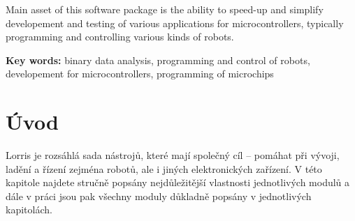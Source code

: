 \documentclass[12pt, a4paper, oneside]{article}
\newcommand{\D}{\medskip \noindent} %
\newcommand{\B}{\textbf} %
\begin{document}
Main asset of this software package is the ability to speed-up and simplify developement and testing of various applications for microcontrollers, typically programming and controlling various kinds of robots.

\D \B{Key words:} binary data analysis, programming and control of robots, developement for microcontrollers, programming of microchips

\addtolength{\textheight}{30mm} %

\newpage
\pagestyle{plain}

\setlength{\voffset}{-20mm} %
\setcounter{page}{1}  %

\tableofcontents  %

\addtolength{\textheight}{-30mm} %
\newpage
\setlength{\voffset}{0mm} %
\pagestyle{plain}

\section*{Úvod}
\label{uvod}
Lorris je rozsáhlá sada nástrojů, které mají společný cíl -- pomáhat při vývoji, ladění a řízení zejména robotů, ale i jiných elektronických zařízení. V této kapitole najdete stručně popsány nejdůležitější vlastnosti jednotlivých modulů a dále v práci jsou pak všechny moduly důkladně popsány v jednotlivých kapitolách.
\end{document}
